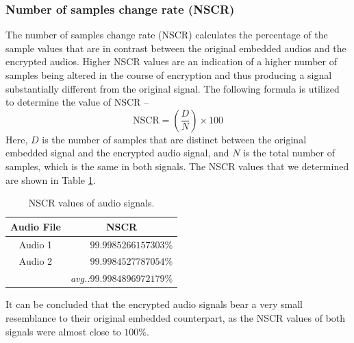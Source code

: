 \documentclass[a4paper]{cas-sc}
\begin{document}
\subsubsection{Number of samples change rate (NSCR)}
The number of samples change rate (NSCR) calculates the percentage of the sample values that are in contrast between the original embedded audios and the encrypted audios. Higher NSCR values are an indication of a higher number of samples being altered in the course of encryption and thus producing a signal substantially different from the original signal. The following formula is utilized to determine the value of NSCR --
\begin{equation}
    \text{NSCR}=\left(\frac{D}{N}\right)\times100
\end{equation}
Here, $D$ is the number of samples that are distinct between the original embedded signal and the encrypted audio signal, and $N$ is the total number of samples, which is the same in both signals. The NSCR values that we determined are shown in Table \ref{table:nscr}.
\begin{table}[pos=h]
    \begin{center}
        \caption{NSCR values of audio signals.}
        \begin{tabular}{cr}
            \hline
            Audio File & \multicolumn{1}{c}{NSCR}                    \\ \hline
            Audio 1    & $99.9985266157303\%$                        \\ \hdashline
            Audio 2    & $99.9984527787054\%$                        \\ \hline
                       & \textit{avg.:}$\mathbf{99.9984896972179\%}$
        \end{tabular}
        \label{table:nscr}
    \end{center}
\end{table}

It can be concluded that the encrypted audio signals bear a very small resemblance to their original embedded counterpart, as the NSCR values of both signals were almost close to $100\%$.
\end{document}
